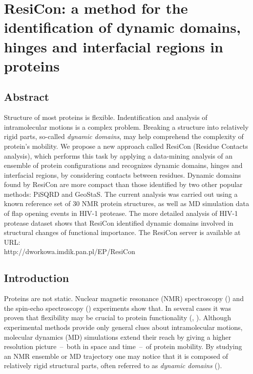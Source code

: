 



\newcommand{\angstrom}{\mbox{\normalfont\AA}}
\newcommand{\myHeight}{0.13}
\renewcommand{\arraystretch}{1.9} %



\chapter[Dynamic domains identification]{ResiCon: a method for the identification of dynamic domains, hinges and interfacial regions in proteins}

\section{Abstract}

Structure of most proteins is flexible.
Indentification and analysis of intramolecular motions is a complex problem.
Breaking a structure into relatively rigid parts, so-called \emph{dynamic domains}, may help comprehend the complexity of protein's mobility. 
We propose a new approach called ResiCon (Residue Contacts analysis), which performs this task by applying a data-mining analysis of an ensemble of protein configurations and recognizes dynamic domains, hinges and interfacial regions, by considering contacts between residues. 
Dynamic domains found by ResiCon are more compact than those identified by two other popular methods: PiSQRD and GeoStaS.
The current analysis was carried out using a known reference set of 30 NMR protein structures, as well as MD simulation data of flap opening events in HIV-1 protease.
The more detailed analysis of HIV-1 protease dataset shows that ResiCon identified dynamic domains involved in structural changes of functional importance.
The ResiCon server is available at URL:\\ http://dworkowa.imdik.pan.pl/EP/ResiCon

\section{Introduction}
Proteins are not static.
Nuclear magnetic resonance (NMR) spectroscopy (\cite{martin1988two}) and the spin-echo spectroscopy (\cite{bu2011proteins}) experiments show that.
In several cases it was proven that flexibility may be crucial to protein functionality (\cite{farago2010activation}, \cite{hamelberg2005fast}).
Although experimental methods provide only general clues about intramolecular motions, molecular dynamics (MD) simulations extend their reach by giving a higher resolution picture~--~both in space and time~--~of protein mobility.
By studying an NMR ensemble or MD trajectory one may notice that it is composed of relatively rigid structural parts, often referred to as \emph{dynamic domains} (\cite{hayward1997model}).

